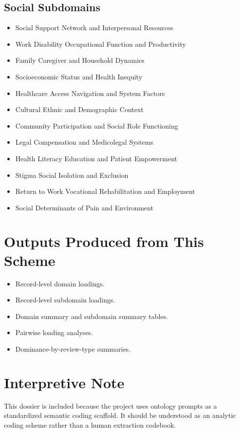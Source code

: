 \documentclass[11pt]{article}
\begin{document}
\subsection*{Social Subdomains}
\begin{itemize}
\item Social Support Network and Interpersonal Resources
\item Work Disability Occupational Function and Productivity
\item Family Caregiver and Household Dynamics
\item Socioeconomic Status and Health Inequity
\item Healthcare Access Navigation and System Factors
\item Cultural Ethnic and Demographic Context
\item Community Participation and Social Role Functioning
\item Legal Compensation and Medicolegal Systems
\item Health Literacy Education and Patient Empowerment
\item Stigma Social Isolation and Exclusion
\item Return to Work Vocational Rehabilitation and Employment
\item Social Determinants of Pain and Environment
\end{itemize}

\section*{Outputs Produced from This Scheme}
\begin{itemize}
\item Record-level domain loadings.
\item Record-level subdomain loadings.
\item Domain summary and subdomain summary tables.
\item Pairwise loading analyses.
\item Dominance-by-review-type summaries.
\end{itemize}

\section*{Interpretive Note}
This dossier is included because the project uses ontology prompts as a standardized semantic coding scaffold. It should be understood as an analytic coding scheme rather than a human extraction codebook.
\end{document}
